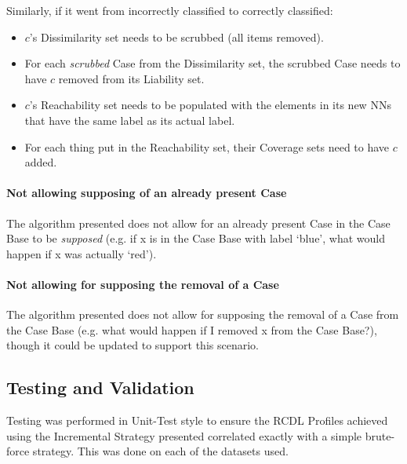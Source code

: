 \documentclass[a4paper,11pt]{report}
\begin{document}
Similarly, if it went from incorrectly classified to correctly classified:
\begin{itemize}
	\item $c$'s Dissimilarity set needs to be scrubbed (all items removed).
	\item For each \emph{scrubbed} Case from the Dissimilarity set, the scrubbed Case needs to have $c$ removed from its Liability set.
	\item $c$'s Reachability set needs to be populated with the elements in its new NNs that have the same label as its actual label.
	\item For each thing put in the Reachability set, their Coverage sets need to have $c$ added.
\end{itemize}

\paragraph{Not allowing supposing of an already present Case}
The algorithm presented does not allow for an already present Case in the Case Base to be \emph{supposed} (e.g. if x is in the Case Base with label `blue', what would happen if x was actually `red').

\paragraph{Not allowing for supposing the removal of a Case}
The algorithm presented does not allow for supposing the removal of a Case from the Case Base (e.g. what would happen if I removed x from the Case Base?), though it could be updated to support this scenario.

\subsection{Testing and Validation}
Testing was performed in Unit-Test style to ensure the RCDL Profiles achieved using the Incremental Strategy presented correlated exactly with a simple brute-force strategy. This was done on each of the datasets used.

\vspace{10pt}
\end{document}

